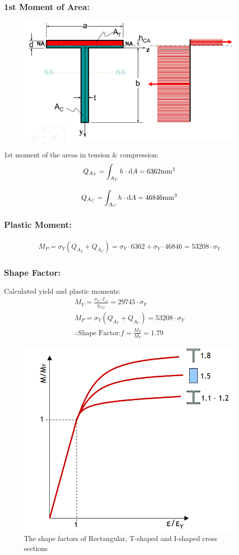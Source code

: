 \documentclass[class=report, crop=false, 12pt,a4paper]{standalone}
\begin{document}
\subsubsection{1st Moment of Area:}
\begin{figure}[H]
  \centering
  \includegraphics[width = 0.7 \textwidth]{../img/diagram7.PNG}
\end{figure}
1st moment of the areas in tension \& compression:
\begin{gather}
  Q_{A_T} = \int_{A_T}h\cdot\dif A = 6362\text{mm}^3 \\[10pt]
  Q_{A_C} = \int_{A_C}h\cdot\dif A = 46846\text{mm}^3
\end{gather}
\subsubsection{Plastic Moment:}
\begin{gather}
  M_P = \sigma_Y(Q_{A_T}+Q_{A_C}) = \sigma_Y\cdot 6362+\sigma_Y\cdot 46846 = 53208\cdot\sigma_Y
\end{gather}
\subsubsection{Shape Factor:}
Calculated yield and plastic moments:
\begin{gather}
  M_Y = \frac{\sigma_Y\cdot I_{zz}}{y_{CG}} = 29745\cdot\sigma_Y \\[10pt]
  M_P = \sigma_Y(Q_{A_T}+Q_{A_C}) = 53208\cdot\sigma_Y \\[10pt]
  \therefore \text{Shape Factor:}f=\frac{M_P}{M_Y} = 1.79
\end{gather}
\begin{figure}[H]
  \centering
  \includegraphics[width = 0.5 \textwidth]{../img/graph6.PNG}
  \caption{The shape factors of Rectangular, T-shaped and I-shaped cross sections}
\end{figure}
\end{document}
